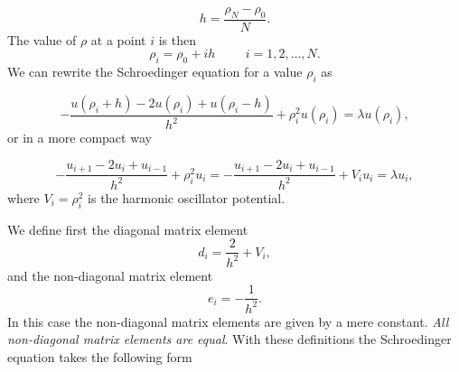 \documentclass{article}
\begin{document}
\begin{equation*}
  h=\frac{\rho_N-\rho_0 }{N}.
\end{equation*}
The value of $\rho$ at a point $i$ is then 
\[
    \rho_i= \rho_0 + ih \hspace{1cm} i=1,2,\dots , N.
\]
We can rewrite the Schroedinger equation for a value $\rho_i$ as

\[
-\frac{u(\rho_i+h) -2u(\rho_i) +u(\rho_i-h)}{h^2}+\rho_i^2u(\rho_i)  = \lambda u(\rho_i),
\]
or in  a more compact way

\[
-\frac{u_{i+1} -2u_i +u_{i-1}}{h^2}+\rho_i^2u_i=-\frac{u_{i+1} -2u_i +u_{i-1} }{h^2}+V_iu_i  = \lambda u_i,
\]
where $V_i=\rho_i^2$ is the harmonic oscillator potential.

We define first the diagonal matrix element
\begin{equation*}
   d_i=\frac{2}{h^2}+V_i,
\end{equation*}
and the non-diagonal matrix element
\begin{equation*}
   e_i=-\frac{1}{h^2}.
\end{equation*}
In this case the non-diagonal matrix elements are given by a mere constant.
\emph{All non-diagonal matrix elements are equal}.
With these definitions the Schroedinger equation takes the following form
\end{document}
